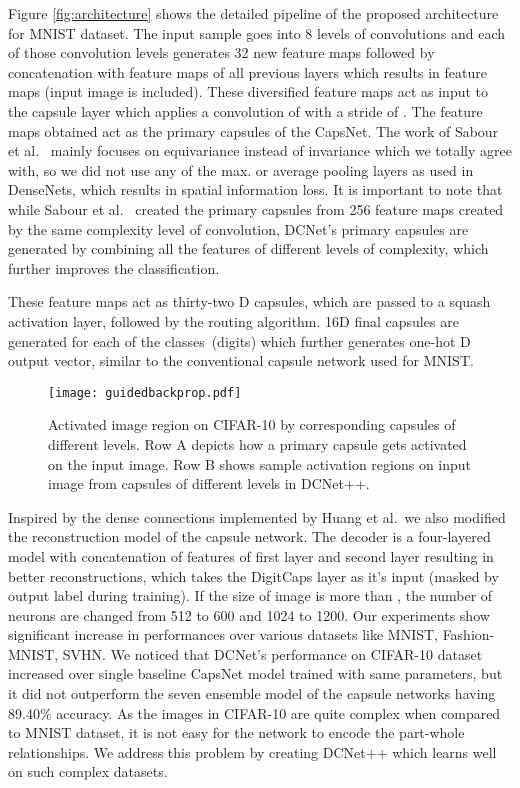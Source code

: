 \documentclass{bmvc2k}
\begin{document}
Figure \ref{fig:architecture} shows the detailed pipeline of the proposed architecture for MNIST dataset.
The input sample goes into 8 levels of convolutions and each of those convolution levels generates 32 new feature maps followed by concatenation with feature maps of all previous layers which results in  feature maps (input image is included). These diversified feature maps act as input to the capsule layer which applies a convolution of  with a stride of . The feature maps obtained act as the primary capsules of the CapsNet. The work of Sabour et al.\ \cite{capsnet} mainly focuses on equivariance instead of invariance which we totally agree with, so we did not use any of the max. or average pooling layers as used in DenseNets, which results in spatial information loss. It is important to note that while Sabour et al.\ \cite{capsnet} created the primary capsules from 256 feature maps created by the same complexity level of convolution, DCNet's primary capsules are generated by combining all the features of different levels of complexity, which further improves the classification. 

These feature maps act as thirty-two D capsules, which are passed to a squash activation layer, followed by the routing algorithm. 16D final capsules are generated for each of the  classes~(digits) which further generates one-hot D output vector, similar to the conventional capsule network used for MNIST.

\begin{figure*}[!htbp]
\begin{center}
\texttt{[image: guidedbackprop.pdf]}
\end{center}
\vspace*{-4mm}
\caption{Activated image region on CIFAR-10 by corresponding capsules of different levels. Row A depicts how a primary capsule gets activated on the input image. Row B shows sample activation regions on input image from capsules of different levels in DCNet++.}
\label{fig:capactivations}
\end{figure*}

Inspired by the dense connections implemented by Huang et al.\, we also modified the reconstruction model of the capsule network. The decoder is a four-layered model with concatenation of features of first layer and second layer resulting in better reconstructions, which takes the DigitCaps layer as it's input (masked by output label during training). If the size of image is more than , the number of neurons are changed from 512 to 600 and 1024 to 1200. Our experiments show significant increase in performances over various datasets like MNIST, Fashion-MNIST, SVHN. We noticed that DCNet's performance on CIFAR-10 dataset increased over single baseline CapsNet model trained with same parameters, but it did not outperform the seven ensemble model \cite{capsnet} of the capsule networks having 89.40\% accuracy. As the images in CIFAR-10 are quite complex when compared to MNIST dataset,  it is not easy for the network to encode the part-whole relationships. We address this problem by creating DCNet++ which learns well on such complex datasets.
\end{document}
